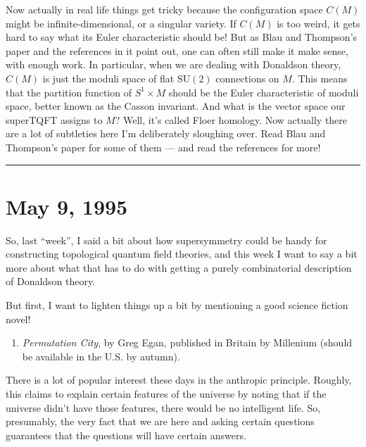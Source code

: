 \documentclass{article}
\def\tightlist{}
\begin{document}
Now actually in real life things get tricky because the configuration
space \(C(M)\) might be infinite-dimensional, or a singular variety. If
\(C(M)\) is too weird, it gets hard to say what its Euler characteristic
should be! But as Blau and Thompson's paper and the references in it
point out, one can often still make it make sense, with enough work. In
particular, when we are dealing with Donaldson theory, \(C(M)\) is just
the moduli space of flat \(\mathrm{SU}(2)\) connections on \(M\). This
means that the partition function of \(S^1\times M\) should be the Euler
characteristic of moduli space, better known as the Casson invariant.
And what is the vector space our superTQFT assigns to \(M\)? Well, it's
called Floer homology. Now actually there are a lot of subtleties here
I'm deliberately sloughing over. Read Blau and Thompson's paper for some
of them --- and read the references for more!

\begin{center}\rule{0.5\linewidth}{0.5pt}\end{center}



\hypertarget{week52}{%
\section{May 9, 1995}\label{week52}}

So, last ``week'', I said a bit about how supersymmetry could be handy
for constructing topological quantum field theories, and this week I
want to say a bit more about what that has to do with getting a purely
combinatorial description of Donaldson theory.

But first, I want to lighten things up a bit by mentioning a good
science fiction novel!

\begin{enumerate}
\def\labelenumi{\arabic{enumi})}
\tightlist
\item
  \emph{Permutation City}, by Greg Egan, published in Britain by
  Millenium (should be available in the U.S. by autumn).
\end{enumerate}

There is a lot of popular interest these days in the anthropic
principle. Roughly, this claims to explain certain features of the
universe by noting that if the universe didn't have those features,
there would be no intelligent life. So, presumably, the very fact that
we are here and asking certain questions guarantees that the questions
will have certain answers.
\end{document}
